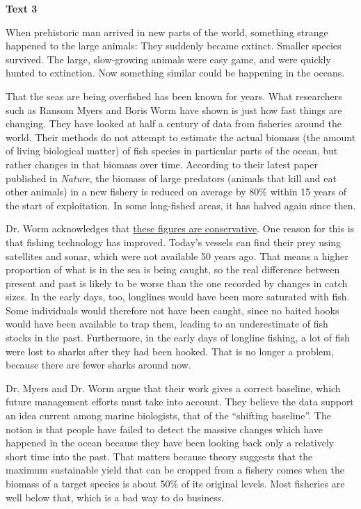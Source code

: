 
\begin{center}\textbf{Text 3}\end{center}

\qquad When prehistoric man arrived in new parts of the world, something strange happened to the large animals: They suddenly became extinct. Smaller species survived. The large, slow-growing animals were easy game, and were quickly hunted to extinction. Now something similar could be happening in the oceans.

\qquad That the seas are being overfished has been known for years. What researchers such as Ransom Myers and Boris Worm have shown is just how fast things are changing. They have looked at half a century of data from fisheries around the world. Their methods do not attempt to estimate the actual biomass (the amount of living biological matter) of fish species in particular parts of the ocean, but rather changes in that biomass over time. According to their latest paper published in \emph{Nature}, the biomass of large predators (animals that kill and eat other animals) in a new fishery is reduced on average by 80\% within 15 years of the start of exploitation. In some long-fished areas, it has halved again since then.

\qquad Dr. Worm acknowledges that \ul{these figures are conservative}. One reason for this is that fishing technology has improved. Today's vessels can find their prey using satellites and sonar, which were not available 50 years ago. That means a higher proportion of what is in the sea is being caught, so the real difference between present and past is likely to be worse than the one recorded by changes in catch sizes. In the early days, too, longlines would have been more saturated with fish. Some individuals would therefore not have been caught, since no baited hooks would have been available to trap them, leading to an underestimate of fish stocks in the past. Furthermore, in the early days of longline fishing, a lot of fish were lost to sharks after they had been hooked. That is no longer a problem, because there are fewer sharks around now.

\qquad Dr. Myers and Dr. Worm argue that their work gives a correct baseline, which future management efforts must take into account. They believe the data support an idea current among marine biologists, that of the ``shifting baseline''. The notion is that people have failed to detect the massive changes which have happened in the ocean because they have been looking back only a relatively short time into the past. That matters because theory suggests that the maximum sustainable yield that can be cropped from a fishery comes when the biomass of a target species is about 50\% of its original levels. Most fisheries are well below that, which is a bad way to do business.

